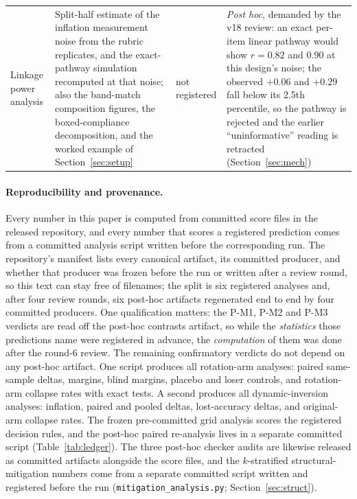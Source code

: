 \documentclass[11pt]{article}
\begin{document}
\begin{longtable}{L{1.7cm}L{5.3cm}L{2.5cm}L{5.1cm}}
\addlinespace[1pt]
Linkage power analysis & Split-half estimate of the inflation measurement noise from the rubric replicates, and the exact-pathway simulation recomputed at that noise; also the band-match composition figures, the boxed-compliance decomposition, and the worked example of Section~\ref{sec:setup} & not registered & \emph{Post hoc}, demanded by the v18 review: an exact per-item linear pathway would show $r = 0.82$ and $0.90$ at this design's noise; the observed $+0.06$ and $+0.29$ fall below its 2.5th percentile, so the pathway is rejected and the earlier ``uninformative'' reading is retracted (Section~\ref{sec:mech}) \\
\end{longtable}
\endgroup

\paragraph{Reproducibility and provenance.}
Every number in this paper is computed from committed score files in the released repository, and every number that scores a registered prediction comes from a committed analysis script written before the corresponding run.
The repository's manifest lists every canonical artifact, its committed producer, and whether that producer was frozen before the run or written after a review round, so this text can stay free of filenames; the split is six registered analyses and, after four review rounds, six post-hoc artifacts regenerated end to end by four committed producers.
One qualification matters: the P-M1, P-M2 and P-M3 verdicts are read off the post-hoc contrasts artifact, so while the \emph{statistics} those predictions name were registered in advance, the \emph{computation} of them was done after the round-6 review.
The remaining confirmatory verdicts do not depend on any post-hoc artifact.
One script produces all rotation-arm analyses: paired same-sample deltas, margins, blind margins, placebo and loser controls, and rotation-arm collapse rates with exact tests.
A second produces all dynamic-inversion analyses: inflation, paired and pooled deltas, lost-accuracy deltas, and original-arm collapse rates.
The frozen pre-committed grid analysis scores the registered decision rules, and the post-hoc paired re-analysis lives in a separate committed script (Table~\ref{tab:ledger}).
The three post-hoc checker audits are likewise released as committed artifacts alongside the score files, and the $k$-stratified structural-mitigation numbers come from a separate committed script written and registered before the run (\texttt{mitigation\_analysis.py}; Section~\ref{sec:struct}).
\end{document}
